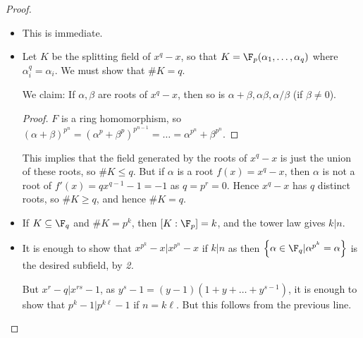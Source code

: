 \documentclass[a4paper, 10pt, twocolumn]{amsart}
\begin{document}
\begin{proof}
\item
\begin{itemize}
\item[\Longrightarrow{2}{1}] This is immediate.
\item[\underline{\textit{2.}}] Let $K$ be the splitting field of $x^q-x$, so that $K = \F_p(\alpha_1, \ldots, \alpha_q)$ where $\alpha_i^q = \alpha_i$. We must show that $\#K = q$.

We claim: If $\alpha, \beta$ are roots of $x^q - x$, then so is $\alpha+\beta, \alpha\beta, \alpha/\beta$ (if $\beta\neq 0$).
\begin{proof}
$F$ is a ring homomorphism, so $(\alpha+\beta)^{p^n} = (\alpha^p + \beta^p)^{p^{n-1}} = \ldots = \alpha^{p^n} + \beta^{p^n}$.
\end{proof}
This implies that the field generated by the roots of $x^q-x$ is just the union of these roots, so $\#K \leq q$. But if $\alpha$ is a root $f(x) = x^q-x$, then $\alpha$ is not a root of $f'(x) = qx^{q-1} - 1 = -1$ as $q = p^r = 0$. Hence $x^q-x$ has $q$ distinct roots, so $\#K \geq q$, and hence $\#K = q$.
\item[\underline{$\implies$\textit{3.}}] If $K\subseteq \F_q$ and $\#K=p^k$, then $[K:\F_p] = k$, and the tower law gives $k|n$.
\item[\underline{$\impliedby$\textit{3.}}] It is enough to show that $x^{p^k}-x | x^{p^n}-x$ if $k|n$ as then $\left\{\alpha\in\F_q | \alpha^{p^k} = \alpha\right\}$ is the desired subfield, by \textit{2.}

But $x^r-q | x^{rs} - 1$, as $y^s - 1 = (y-1)(1+ y + \ldots + y^{s-1})$, it is enough to show that $p^k-1 | p^{k\ell}-1$ if $n=k\ell$. But this follows from the previous line.
\end{itemize}
\end{proof}
\end{document}
